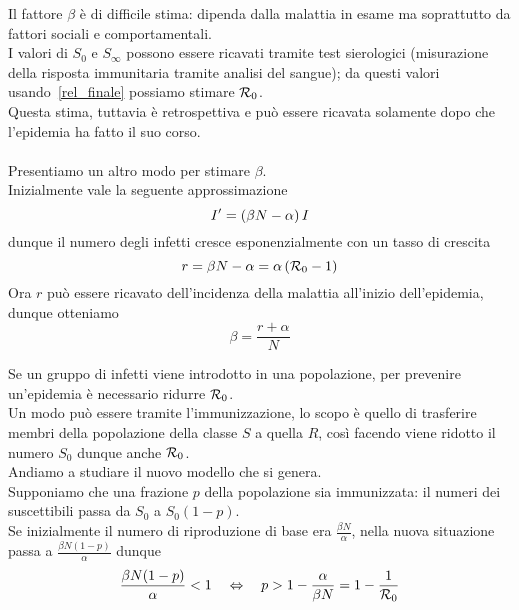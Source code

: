 \begin{oss}Il fattore $\beta$ \`e di difficile stima: dipenda dalla malattia in esame ma soprattutto da fattori sociali e comportamentali.\\
I valori di $S_0$ e $S_\infty$ possono essere ricavati tramite test sierologici (misurazione della risposta immunitaria tramite analisi del sangue); da questi valori usando~\ref{rel_finale} possiamo stimare $\mathcal R_0$.\\
Questa stima, tuttavia \`e retrospettiva e pu\`o essere ricavata solamente dopo che l'epidemia ha fatto il suo corso.\\ \\
Presentiamo un altro modo per stimare $\beta$.\\
Inizialmente vale la seguente approssimazione 
$$ I' = \left(  \beta N -\alpha  \right) I$$ 
dunque il numero degli infetti cresce esponenzialmente con un tasso di crescita 
$$ r =\beta N - \alpha = \alpha \left(  \mathcal R_0 -1 \right)$$
Ora $r$ pu\`o essere ricavato dell'incidenza della malattia  all'inizio dell'epidemia, dunque otteniamo 
$$ \beta = \frac{r + \alpha } {N}$$
\end{oss}

\begin{oss}[Immunizzazione]
Se un gruppo di infetti viene introdotto in una popolazione, per prevenire un'epidemia \`e necessario ridurre $\mathcal R_0$.\\
Un modo pu\`o essere tramite l'immunizzazione, lo scopo \`e quello di trasferire membri della popolazione della classe $S$ a quella $R$, cos\`i facendo viene ridotto il numero $S_0$ dunque anche $\mathcal R_0$.\\
Andiamo a studiare il nuovo modello che si genera.\\
Supponiamo che una frazione $p$ della popolazione sia  immunizzata: il numeri dei suscettibili passa da $S_0$ a $S_0(1-p)$.\\
Se inizialmente il numero di riproduzione di base era $\frac{\beta N}{\alpha}$, nella nuova situazione passa a $\frac{\beta N(1-p)}{\alpha}$ dunque 
$$\frac{\beta N(1-p)}{\alpha}< 1\quad \Leftrightarrow \quad p> 1-\frac{\alpha}{\beta N} = 1 -\frac{1}{\mathcal R_0}
$$

\end{oss}
\newpage
